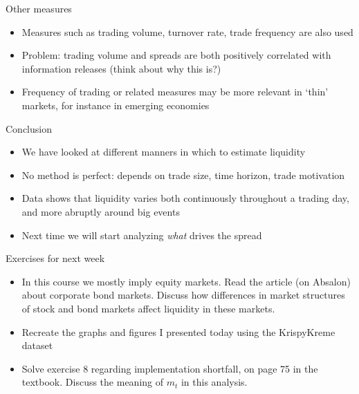 \documentclass[english,10pt]{beamer}
\begin{document}
\begin{frame}{Other measures}
\begin{itemize}
	\item Measures such as trading volume, turnover rate, trade frequency are also used
	\item Problem: trading volume and spreads are both positively correlated with information releases (think about why this is?)
	\item Frequency of trading or related measures may be more relevant in `thin' markets, for instance in emerging economies
\end{itemize}
\end{frame}


\begin{frame}{Conclusion}
	\begin{itemize}
		\item We have looked at different manners in which to estimate liquidity
		\item No method is perfect: depends on trade size, time horizon, trade motivation
		\item Data shows that liquidity varies both continuously throughout a trading day, and more abruptly around big events
		\item Next time we will start analyzing \textit{what} drives the spread
	\end{itemize}
\end{frame}


\begin{frame}{Exercises for next week}
	\begin{itemize}
		\item In this course we mostly imply equity markets. Read the article (on Absalon) about corporate bond markets. Discuss how differences in market structures of stock and bond markets affect liquidity in these markets.
		\item Recreate the graphs and figures I presented today using the KrispyKreme dataset
		\item Solve exercise 8 regarding implementation shortfall, on page 75 in the textbook.
		Discuss the meaning of $m_t$ in this analysis.
	\end{itemize}
\end{frame}
\end{document}
